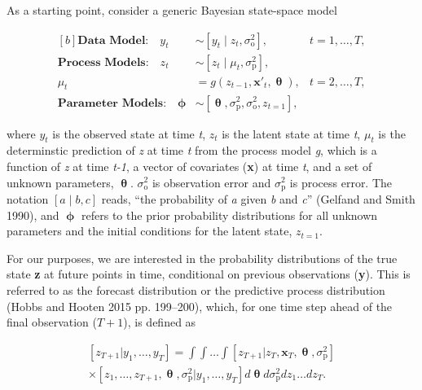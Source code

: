 \documentclass[12pt,]{article}
\begin{document}
As a starting point, consider a generic Bayesian state-space model

\begin{equation}
\begin{aligned}[b]
\textbf{Data Model:} \quad y_t &\sim \left[y_t \;|\; z_t, \sigma^2_{\text{o}}\right], &t = 1,\dots,T, \\ 
\textbf{Process Models:} \quad z_t &\sim \left[z_t \;|\; \mu_t, \sigma^2_{\text{p}}\right],  \\ 
\mu_t &= g \left(z_{t-1},\textbf{x}'_t, \bm{\uptheta} \right), &t = 2,\dots,T, \\ 
\textbf{Parameter Models:} \quad \bm{\upphi} &\sim \left[\bm{\uptheta},\sigma^2_{\text{p}},\sigma^2_{\text{o}},z_{t=1} \right],
\end{aligned}
\end{equation}

\noindent{}where \(y_t\) is the observed state at time \emph{t}, \(z_t\)
is the latent state at time \emph{t}, \(\mu_t\) is the determinstic
prediction of \emph{z} at time \emph{t} from the process model \emph{g},
which is a function of \emph{z} at time \emph{t-1}, a vector of
covariates (\textbf{x}) at time \emph{t}, and a set of unknown
parameters, \(\bm{\uptheta}\). \(\sigma^2_{\text{o}}\) is observation
error and \(\sigma^2_{\text{p}}\) is process error. The notation
\(\left[a \;|\; b, c\right]\) reads, ``the probability of \emph{a} given
\emph{b} and \emph{c}'' (Gelfand and Smith 1990), and \(\bm{\upphi}\)
refers to the prior probability distributions for all unknown parameters
and the initial conditions for the latent state, \(z_{t=1}\).

For our purposes, we are interested in the probability distributions of
the true state \textbf{z} at future points in time, conditional on
previous observations (\textbf{y}). This is referred to as the forecast
distribution or the predictive process distribution (Hobbs and Hooten
2015 pp. 199--200), which, for one time step ahead of the final
observation (\(T+1\)), is defined as

\begin{equation}
\begin{gathered}
\left[z_{T+1} | y_1,\dots,y_T \right] = \int \int \dots \int \left[z_{T+1} | z_T, \textbf{x}_T, \bm{\uptheta}, \sigma^2_{\text{p}} \right] \\ \times \left[z_1,\dots,z_{T+1},\bm{\uptheta}, \sigma^2_{\text{p}} | y_1,\dots,y_T \right] d\bm{\uptheta} d\sigma^2_{\text{p}} dz_1 \dots dz_T.
\end{gathered}
\end{equation}
\end{document}
